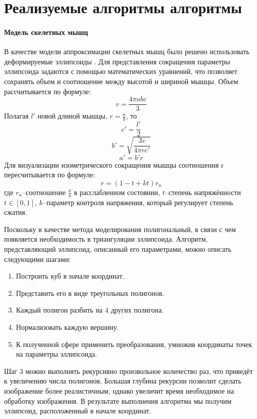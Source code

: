 \section{Реализуемые алгоритмы алгоритмы}
\label{sec:algs}
\paragraph{Модель скелетных мышц}
В качестве модели аппроксимации скелетных мышц было решено использовать деформируемые эллипсоиды \cite{scheepers97}. Для представления сокращения параметры эллипсоида задаются с помощью математических уравнений, что позволяет сохранять объем и соотношение между высотой и шириной мышцы. Объем рассчитывается по формуле:
\begin{equation}
	v = \frac{4\pi abc}{3}
\end{equation}
Полагая $l'$ новой длиной мышцы, $r=\frac{a}{b}$, то 
\begin{equation}
	c'=\frac{l'}{2}
\end{equation}
\begin{equation}
	b'=\sqrt{\frac{3v}{4\pi rc'}}
\end{equation}
\begin{equation}
	a'=b'r
\end{equation}
Для визуализации изометрического сокращения мышцы соотношения r пересчитывается по формуле:
\begin{equation}
	r=(1-t+kt)r_n
\end{equation}
где $r_n$--соотношение $\frac{a}{b}$ в расслабленном состоянии, $t$--степень напряжённости $t\in [0,1]$, $k$--параметр контроля напряжения, который регулирует степень сжатия.

\par Поскольку в качестве метода моделирования полигональный, в связи с чем появляется необходимость в триангуляции эллипсоида. Алгоритм, представляющий эллипсоид, описанный его параметрами, можно описать следующими шагами:
\begin{enumerate}[1.]
	\item Построить куб в начале координат.
	\item Представить его в виде треугольных полигонов.
	\item Каждый полигон разбить на 4 других полигона.
	\item Нормализовать каждую вершину.
	\item К полученной сфере применить преобразования, умножив координаты точек на параметры эллипсоида.
\end{enumerate}
Шаг 3 можно выполнять рекурсивно произвольное количество раз, что приведёт к увеличению числа полигонов. Большая глубина рекурсии позволит сделать изображение более реалистичным, однако увеличит время необходимое на обработку изображения. В результате выполнения алгоритма мы получим эллипсоид, расположенный в начале координат.

